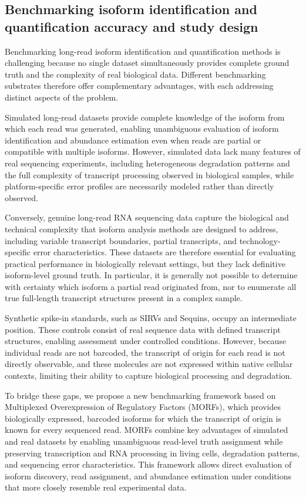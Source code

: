\subsection{Benchmarking isoform identification and quantification accuracy and study design}\label{benchmarking-isoform-identification-and-quantification-accuracy-and-study-design}

Benchmarking long-read isoform identification and quantification methods is challenging because no single dataset simultaneously provides complete ground truth and the complexity of real biological data. Different benchmarking substrates therefore offer complementary advantages, with each addressing distinct aspects of the problem.

Simulated long-read datasets provide complete knowledge of the isoform from which each read was generated, enabling unambiguous evaluation of isoform identification and abundance estimation even when reads are partial or compatible with multiple isoforms. However, simulated data lack many features of real sequencing experiments, including heterogeneous degradation patterns and the full complexity of transcript processing observed in biological samples, while platform-specific error profiles are necessarily modeled rather than directly observed.

Conversely, genuine long-read RNA sequencing data capture the biological and technical complexity that isoform analysis methods are designed to address, including variable transcript boundaries, partial transcripts, and technology-specific error characteristics. These datasets are therefore essential for evaluating practical performance in biologically relevant settings, but they lack definitive isoform-level ground truth. In particular, it is generally not possible to determine with certainty which isoform a partial read originated from, nor to enumerate all true full-length transcript structures present in a complex sample.

Synthetic spike-in standards, such as SIRVs and Sequins, occupy an intermediate position. These controls consist of real sequence data with defined transcript structures, enabling assessment under controlled conditions. However, because individual reads are not barcoded, the transcript of origin for each read is not directly observable, and these molecules are not expressed within native cellular contexts, limiting their ability to capture biological processing and degradation.

To bridge these gaps, we propose a new benchmarking framework based on Multiplexed Overexpression of Regulatory Factors (MORFs), which provides biologically expressed, barcoded isoforms for which the transcript of origin is known for every sequenced read. MORFs combine key advantages of simulated and real datasets by enabling unambiguous read-level truth assignment while preserving transcription and RNA processing in living cells, degradation patterns, and sequencing error characteristics. This framework allows direct evaluation of isoform discovery, read assignment, and abundance estimation under conditions that more closely resemble real experimental data.

